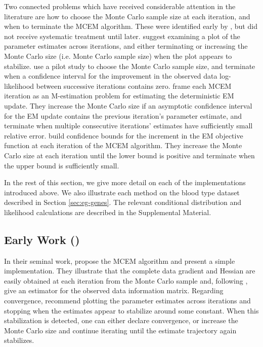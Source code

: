 \documentclass[ss]{imsart}
\theoremstyle{plain}
\theoremstyle{definition}
\theoremstyle{remark}
\begin{document}
Two connected problems which have received considerable attention in the literature are how to choose the Monte Carlo sample size at each iteration, and when to terminate the MCEM algorithm. These were identified early by \citet{Wei90}, but did not receive systematic treatment until later. \citet{Wei90} suggest examining a plot of the parameter estimates across iterations, and either terminating or increasing the Monte Carlo size (i.e. Monte Carlo sample size) when the plot appears to stabilize. \citet{Cha95} use a pilot study to choose the Monte Carlo sample size, and terminate when a confidence interval for the improvement in the observed data log-likelihood between successive iterations contains zero. \citet{Boo99} frame each MCEM iteration as an M-estimation problem for estimating the deterministic EM update. They increase the Monte Carlo size if an asymptotic confidence interval for the EM update contains the previous iteration's parameter estimate, and terminate when multiple consecutive iterations' estimates have sufficiently small relative error. \citet{Caf05} build confidence bounds for the increment in the EM objective function at each iteration of the MCEM algorithm. They increase the Monte Carlo size at each iteration until the lower bound is positive and terminate when the upper bound is sufficiently small.

In the rest of this section, we give more detail on each of the implementations introduced above. We also illustrate each method on the blood type dataset described in Section \ref{sec:eg-genes}. The relevant conditional distribution and likelihood calculations are described in the Supplemental Material.

\subsection{Early Work (\citealp{Wei90})}

In their seminal work, \citet{Wei90} propose the MCEM algorithm and present a simple implementation. They illustrate that the complete data gradient and Hessian are easily obtained at each iteration from the Monte Carlo sample and, following \citet{Lou82}, give an estimator for the observed data information matrix. Regarding convergence, \citeauthor{Wei90} recommend plotting the parameter estimates across iterations and stopping when the estimates appear to stabilize around some constant. When this stabilization is detected, one can either declare convergence, or increase the Monte Carlo size and continue iterating until the estimate trajectory again stabilizes.
\end{document}
